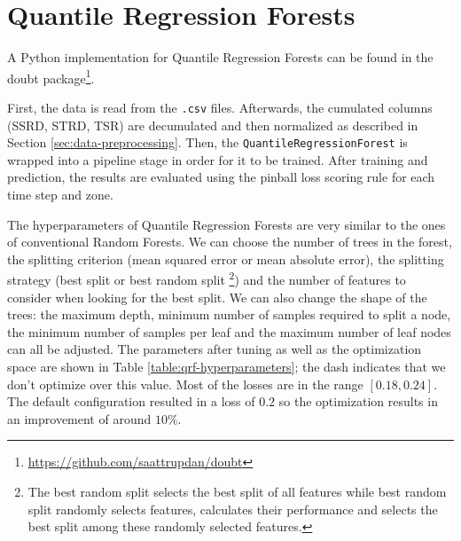 \section{Quantile Regression Forests}
\label{sec:implementation-qrf}

A Python implementation for Quantile Regression Forests can 
be found in the doubt package\footnote{\url{https://github.com/saattrupdan/doubt}}.

First, the data is read from the \texttt{.csv} files. 
Afterwards, the cumulated columns (SSRD, STRD, TSR) are decumulated and then normalized 
as described in Section \ref{sec:data-preprocessing}.
Then, the \texttt{QuantileRegressionForest} is wrapped into a pipeline stage in order for 
it to be trained.
After training and prediction, the results are evaluated 
using the pinball loss scoring rule for each time step and zone.

The hyperparameters of Quantile Regression Forests are very similar to the ones 
of conventional Random Forests. We can choose the number of trees in the forest, 
the splitting criterion (mean squared error or mean absolute error), 
the splitting strategy (best split or best random split
\footnote{The best random split selects the best split of all features while best random split 
randomly selects features, calculates their performance and selects the best split 
among these randomly selected features.}) 
and the number of features to consider when looking for the best split. 
We can also change the shape of the trees: 
the maximum depth, minimum number of samples required to split a node, the minimum number of samples per leaf and 
the maximum number of leaf nodes can all be adjusted.
The parameters after tuning as well as the optimization space 
are shown in Table \ref{table:qrf-hyperparameters}; the dash indicates that we don't optimize over this value.
Most of the losses are in the range \([0.18, 0.24]\). 
The default configuration resulted in a loss of \(0.2\) so 
the optimization results in an improvement of around \(10\%\).


